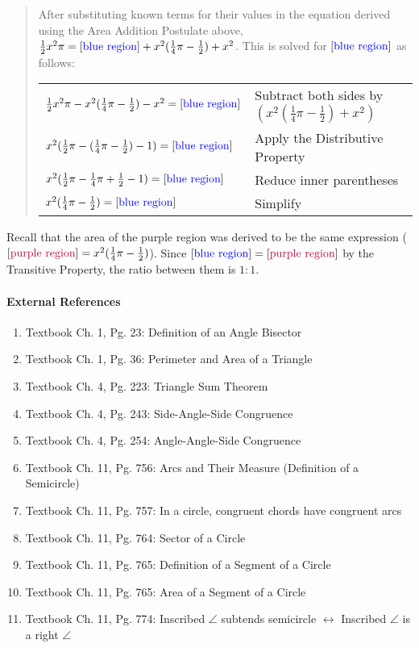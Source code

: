 \documentclass[letterpaper,12pt,twoside]{report}
\begin{document}
\begin{quotation}
		After substituting known terms for their values in the equation derived using the Area Addition Postulate above, $\frac{1}{2}x^2\pi=[\text{\color{blue} blue region}]+x^2(\frac{1}{4}\pi-\frac{1}{2})+x^2$. This is solved for $[\text{\color{blue} blue region}]$ as follows:
		
		\begin{center}
			\begin{tabular}{l | l}
				$\frac{1}{2}x^2\pi-x^2(\frac{1}{4}\pi-\frac{1}{2})-x^2=[\text{\color{blue} blue region}]$ & Subtract both sides by $(x^2(\frac{1}{4}\pi-\frac{1}{2})+x^2)$ \\
				$x^2(\frac{1}{2}\pi-(\frac{1}{4}\pi-\frac{1}{2})-1)=[\text{\color{blue} blue region}]$ & Apply the Distributive Property \\
				$x^2(\frac{1}{2}\pi-\frac{1}{4}\pi+\frac{1}{2}-1)=[\text{\color{blue} blue region}]$ & Reduce inner parentheses \\
				$x^2(\frac{1}{4}\pi-\frac{1}{2})=[\text{\color{blue} blue region}]$ & Simplify
			\end{tabular}
		\end{center}
	\end{quotation}
	
	Recall that the area of the {\color{purple} purple} region was derived to be the same expression ($[\text{\color{purple} purple region}]=x^2(\frac{1}{4}\pi-\frac{1}{2})$). Since $[\text{\color{blue} blue region}]=[\text{\color{purple} purple region}]$ by the Transitive Property, the ratio between them is $\boxed{1:1}$.
	
	\paragraph{External References}
	
	\begin{enumerate}
		\item Textbook Ch. 1, Pg. 23: Definition of an Angle Bisector
		\item Textbook Ch. 1, Pg. 36: Perimeter and Area of a Triangle
		\item Textbook Ch. 4, Pg. 223: Triangle Sum Theorem
		\item Textbook Ch. 4, Pg. 243: Side-Angle-Side Congruence
		\item Textbook Ch. 4, Pg. 254: Angle-Angle-Side Congruence
		\item Textbook Ch. 11, Pg. 756: Arcs and Their Measure (Definition of a Semicircle)
		\item Textbook Ch. 11, Pg. 757: In a circle, congruent chords have congruent arcs
		\item Textbook Ch. 11, Pg. 764: Sector of a Circle
		\item Textbook Ch. 11, Pg. 765: Definition of a Segment of a Circle
		\item Textbook Ch. 11, Pg. 765: Area of a Segment of a Circle
		\item Textbook Ch. 11, Pg. 774: Inscribed $\angle$ subtends semicircle  $\leftrightarrow$ Inscribed $\angle$ is a right $\angle$ 
	\end{enumerate}
	
\end{document}
